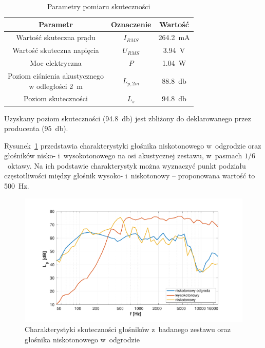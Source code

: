 \documentclass[12pt]{oska}
\begin{document}
		\begin{table}[!ht]
			\centering
			\caption{Parametry pomiaru skuteczności}
			\label{t:skutecznosc}
			\begin{tabular}{|c|c|c|}
				\hline
				\textbf{Parametr} & \textbf{Oznaczenie} & \textbf{Wartość} \\\hline
				Wartość skuteczna prądu & $I_{RMS}$ & \SI{264,2}{\milli\ampere} \\\hline
				Wartość skuteczna napięcia & $U_{RMS}$ & \SI{3,94}{\volt} \\\hline
				Moc elektryczna & $P$ & \SI{1,04}{\watt} \\\hline
				\makecell{Poziom ciśnienia akustycznego\\w odległości \SI{2}{\metre}} & $L_{p,2m}$ & \SI{88,8}{\decibel} \\\hline
				Poziom skuteczności & $L_{s}$ & \SI{94,8}{\decibel} \\\hline
			\end{tabular}
		\end{table}
		
		Uzyskany poziom skuteczności (\SI{94,8}{\decibel}) jest zbliżony do deklarowanego przez producenta (\SI{95}{\decibel}).
		
		Rysunek~\ref{r:skutecznosc} przedstawia charakterystyki głośnika niskotonowego w~odgrodzie oraz głośników nisko- i~wysokotonowego na osi akustycznej zestawu, w~pasmach $1/6$~oktawy. Na ich podstawie charakterystyk można wyznaczyć punkt podziału częstotliwości między głośnik wysoko- i~niskotonowy -- proponowana wartość to \SI{500}{\hertz}.
		
		\begin{figure}[!ht]
			\centering
			\includegraphics[width=.8\textwidth,trim={2cm .5cm 2cm 1cm},clip]{skutecznosci_stolik.pdf}
			\caption{Charakterystyki skuteczności głośników z~badanego zestawu oraz głośnika niskotonowego w~odgrodzie}
			\label{r:skutecznosc}
		\end{figure}
		
\end{document}
